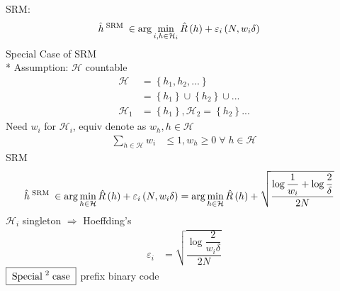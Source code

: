 \documentclass{article}
\begin{document}
SRM:
\begin{align*}
&\hat{h} ^{\text{\;SRM\;}} \in \arg\displaystyle\min_{i, h \in \mathcal{H}_{i}} \hat{R}\left(h\right) + \varepsilon_{i}\left(N, w_{i} \delta\right)
\end{align*}
Special Case of SRM
\\* Assumption: $\mathcal{H}$ countable
\begin{align*}
\mathcal{H} &= \left\{h_{1}, h_{2}, ...\right\}
\\ &= \left\{h_{1}\right\} \cup \left\{h_{2}\right\} \cup ...
\\ \mathcal{H}_{1} &= \left\{h_{1}\right\}, \mathcal{H}_{2} = \left\{h_{2}\right\} ...
\end{align*}
Need $w_{i}$ for $\mathcal{H}_{i}$, equiv denote as $w_{h}, h \in \mathcal{H}$
\begin{align*}
\displaystyle\sum_{h \in \mathcal{H}} w_{i} &\leq  1, w_{h} \geq  0 \;\forall\; h \in \mathcal{H}
\end{align*}
SRM
\begin{align*}
\hat{h} ^{\text{\;SRM\;}} \in \arg\displaystyle\min_{h \in \mathcal{H}} \hat{R}\left(h\right) + \varepsilon_{i}\left(N, w_{i} \delta\right) &= \arg\displaystyle\min_{h \in \mathcal{H}} \hat{R}\left(h\right) + \sqrt{\dfrac{\log \dfrac{1}{w_{i}} + \log \dfrac{2}{\delta}}{2 N}}
\end{align*}
$\mathcal{H}_{i}$ singleton $\Rightarrow $ Hoeffding's
\begin{align*}
\varepsilon_{i} &= \sqrt{\dfrac{\log \dfrac{2}{w_{i} \delta}}{2 N}}
\end{align*}
$\boxed{\text{\;Special\;} ^{2} \text{\;case\;}}$ prefix binary code
\newline \newline
\begin{figure}[H] \centering {} \end{figure}
\end{document}
